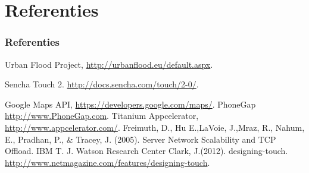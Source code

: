 \documentclass[10pt,a4paper]{beamer}
\begin{document}
\section{Referenties}
\begin{frame}
\begin{thebibliography}{9}
\frametitle{Referenties}
  Urban Flood Project,
  \url{http://urbanflood.eu/default.aspx}.

	Sencha Touch 2.
	\url{http://docs.sencha.com/touch/2-0/}.

	Google Maps API,
	\url{https://developers.google.com/maps/}.
	PhoneGap
	\url{http://www.PhoneGap.com}.
	Titanium Appcelerator,
	\url{http://www.appcelerator.com/}.
	Freimuth, D., Hu E.,LaVoie,  J.,Mraz, R., Nahum, E., Pradhan, P., \& Tracey, J. (2005). Server Network Scalability and TCP Offload.
	IBM T. J. Watson Research Center
	Clark,  J.(2012). designing-touch. \url{http://www.netmagazine.com/features/designing-touch}.
\end{thebibliography}
\end{frame}
\begin{frame}


\end{frame}
\end{document}
